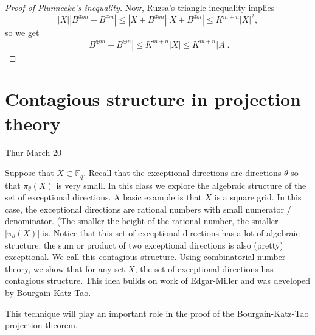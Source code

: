 \documentclass[12pt]{amsart}
\newcommand{\FF}{\mathbb{F}}
\begin{document}
\begin{proof}[Proof of Plunnecke's inequality]
    Now, Ruzsa's triangle inequality implies
    $$|X||B^{\oplus m}-B^{\oplus n}|\leq|X+B^{\oplus m}||X+B^{\oplus n}|\leq K^{m+n}|X|^2,$$
    so we get
    $$|B^{\oplus m}-B^{\oplus n}|\leq K^{m+n}|X|\leq K^{m+n}|A|.$$
\end{proof}


\newpage

\section{Contagious structure in projection theory}  \label{lectcontstruc}

Thur March 20

Suppose that $X \subset \FF_q$.   Recall that the exceptional directions are directions $\theta$ so that $\pi_\theta(X)$ is very small.   
In this class we explore the algebraic structure of the set of exceptional directions.   
  A basic example is that $X$ is a square grid.   In this case,  the exceptional directions are rational numbers with small numerator / denominator.   (The smaller the height of the rational number,  the smaller $|\pi_\theta(X)|$ is.    Notice that this set of exceptional directions has a lot of algebraic structure: the sum or product of two exceptional directions is also (pretty) exceptional.   
   We call this contagious structure.   Using combinatorial number theory,  we show that for any set $X$,  the set of exceptional directions has contagious structure.   This idea builds on work of Edgar-Miller and was developed by Bourgain-Katz-Tao.
    
   This technique will play an important role in the proof of the Bourgain-Katz-Tao projection theorem.
\end{document}
